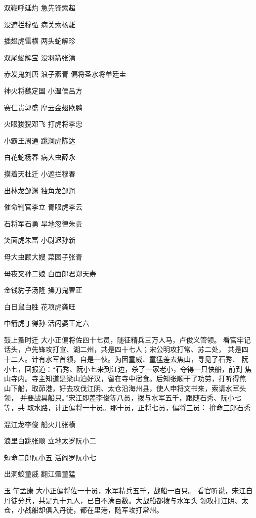 双鞭呼延灼
急先锋索超


没遮拦穆弘
病关索杨雄


插翅虎雷横
两头蛇解珍


双尾蝎解宝
没羽箭张清


赤发鬼刘唐
浪子燕青
偏将圣水将单廷圭

神火将魏定国
小温侯吕方


赛仁贵郭盛
摩云金翅欧鹏

火眼狻猊邓飞
打虎将李忠


小霸王周通
跳涧虎陈达


白花蛇杨春
病大虫薛永


摸着天杜迁
小遮拦穆春


出林龙邹渊
独角龙邹润


催命判官李立
青眼虎李云


石将军石勇
旱地忽律朱贵

笑面虎朱富
小尉迟孙新


母大虫顾大嫂
菜园子张青


母夜叉孙二娘
白面郎君郑天寿

金钱豹子汤隆
操刀鬼曹正


白日鼠白胜
花项虎龚旺


中箭虎丁得孙
活闪婆王定六

鼓上蚤时迁
大小正偏将佐四十七员，随征精兵三万人马，卢俊义管领。
看官牢记话头，卢先锋攻打宣、湖二州，共是四十七人；宋公明攻打常、苏二处，
共是四十二人。计有水军首领，自是一伙。为因童威、童猛差去焦山，寻见了石秀、
阮小七，回报道：“石秀、阮小七来到江边，杀了一家老小，夺得一只快船，前到
焦山寺内。寺主知道是梁山泊好汉，留在寺中宿食。后知张顺干了功劳，打听得焦
山下船，取茆港，好去攻伐江阴、太仓沿海州县，使人申将文书来，索请水军头领，
并要战具船只。”宋江即差李俊等八员，拨与水军五千，跟随石秀、阮小七等，共
取水路，计正偏将一十员。那十员，正将七员，偏将三员：
拚命三郎石秀

混江龙李俊
船火儿张横


浪里白跳张顺
立地太岁阮小二

短命二郎阮小五
活阎罗阮小七

出洞蛟童威
翻江蜃童猛


玉竿孟康
大小正偏将佐一十员，水军精兵五千，战船一百只。
看官听说，宋江自丹徒分兵，共是九十九人，已自不满百数。大战船都拨与水军头
领攻打江阴、太仓，小战船却俱入丹徒，都在里港，随军攻打常州。

